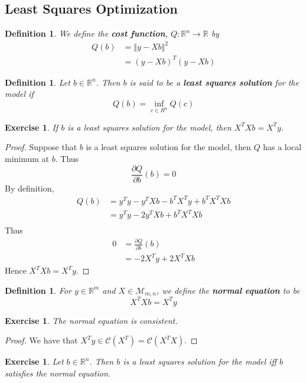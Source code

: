 \documentclass[12pt]{amsart}
\newtheorem{defn}[thm]{Definition}
\newtheorem{ex}[thm]{Exercise}
\newcommand{\R}{\mathbb{R}}
\newcommand{\MC}{\mathcal{C}}
\newcommand{\MM}{\mathcal{M}}
\newcommand{\n}{\Vert}
\begin{document}
\subsection{Least Squares Optimization}

\begin{defn}
We define the \textbf{cost function}, $Q: \R^n \rightarrow \R$ by 
\begin{align*}
Q(b) 
&= \n y - Xb \n ^2 \\
&= (y - Xb )^T(y - Xb )
\end{align*}
\end{defn}

\begin{defn}
Let $b \in \R^n$. Then $b$ is said to be a \textbf{least squares solution} for the model if $$Q(b) = \inf_{c \in R^{n}} Q(c)$$ 
\end{defn}

\begin{ex}
If $b$ is a least squares solution for the model, then $X^TXb = X^Ty$.
\end{ex}

\begin{proof}
Suppose that $b$ is a least squares solution for the model, then $Q$ has a local minimum at $b$. Thus $$\frac{\partial Q}{\partial b}(b) = 0$$ By definition, 
\begin{align*}
Q(b) 
&= y^Ty -y^TXb - b^TX^Ty + b^TX^TXb \\
&= y^Ty -2y^TXb + b^TX^TXb \\ 
\end{align*}
Thus 
\begin{align*}
0
&= \frac{\partial Q}{\partial b}(b) \\
&= -2X^Ty + 2X^TXb
\end{align*}
Hence $X^TXb = X^Ty$.
\end{proof}

\begin{defn}
For $y \in \R^m$ and $X \in \MM_{m,n}$, we define the \textbf{normal equation} to be $$X^TXb = X^Ty$$
\end{defn}

\begin{ex}
The normal equation is consistent.
\end{ex}

\begin{proof}
We have that $X^Ty \in \MC(X^T) = \MC(X^TX)$. 
\end{proof}

\begin{ex}
Let $b \in \R^n$. Then $b$ is a least squares solution for the model iff $b$ satisfies the normal equation.
\end{ex}
\end{document}
